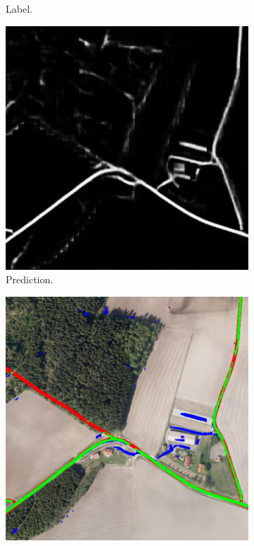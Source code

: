 \begin{figure}[H]
\begin{subfigure}{0.23\textwidth}
\caption{ Label. }
\vspace{0.1cm} %
\end{subfigure}
\hspace*{\fill} %
\begin{subfigure}{0.23\textwidth}
\includegraphics[width=\textwidth]{figs/appendix/pred1151.jpg}
\caption{ Prediction. }
\vspace{0.1cm} %
\end{subfigure}
\hspace*{\fill} %
\begin{subfigure}{0.23\textwidth}
\includegraphics[width=\textwidth]{figs/appendix/hit1151.jpg}

\end{subfigure}
\end{figure}
